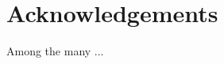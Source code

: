 \documentclass[11pt]{combine}
\begin{document}
\section{Acknowledgements}      %
Among the many ...


%
%
%
%




% 
% 
\end{document}
